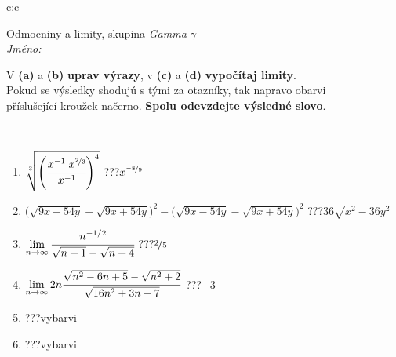 \documentclass[10pt]{report}
\begin{document}
\newpage
\thispagestyle{empty}
\begin{tabular}{c:c}
\begin{minipage}[c][104.5mm][t]{0.5\linewidth}
\begin{center}
\vspace{7mm}
{\huge Odmocniny a limity, skupina \textit{Gamma $\gamma$} -}\\[5mm]
\textit{Jméno:}\phantom{xxxxxxxxxxxxxxxxxxxxxxxxxxxxxxxxxxxxxxxxxxxxxxxxxxxxxxxxxxxxxxxxx}\\[5mm]
\begin{minipage}{0.95\linewidth}
\begin{center}
V \textbf{(a)} a \textbf{(b)} \textbf{uprav výrazy}, v \textbf{(c)} a \textbf{(d)} \textbf{vypočítaj limity}.\\Pokud se výsledky shodujú s tými za otazníky, tak napravo obarvi\\příslušející kroužek načerno. \textbf{Spolu odevzdejte výsledné slovo}.
\end{center}
\end{minipage}
\\[1mm]
\begin{minipage}{0.79\linewidth}
\begin{center}
\begin{varwidth}{\linewidth}
\begin{enumerate}
\small
\item $\sqrt[3]{\left(\cfrac{x^{-1}\;x^{\nicefrac{2}{3}}}{x^{-1}}\right)^{4}}$\quad \dotfill\; ???\;\dotfill \quad $x^{\nicefrac{-8}{9}}$
\item {\footnotesize{\scriptsize$\big(\sqrt{9x-54y}+\sqrt{9x+54y}\big)^2-\big(\sqrt{9x-54y}-\sqrt{9x+54y}\big)^2$}\quad \dotfill\; ???\;\dotfill \quad $36\sqrt{x^2-36y^2}$}
\item $\lim\limits_{n\to\infty}\cfrac{n^{-1/2}}{\sqrt{n+1}-\sqrt{n+4}}$\quad \dotfill\; ???\;\dotfill \quad $\nicefrac{2}{5}$
\item $\lim\limits_{n\to\infty}2n\cfrac{\sqrt{n^2-6n+5}-\sqrt{n^2+2}}{\sqrt{16n^2+3n-7}}$\quad \dotfill\; ???\;\dotfill \quad $-3$
\item \quad \dotfill\; ???\;\dotfill \quad vybarvi
\item \quad \dotfill\; ???\;\dotfill \quad vybarvi
\end{enumerate}
\end{varwidth}
\end{center}
\end{minipage}
\begin{minipage}{0.20\linewidth}

\end{minipage}
\end{center}
\end{minipage}
\end{tabular}
\end{document}
